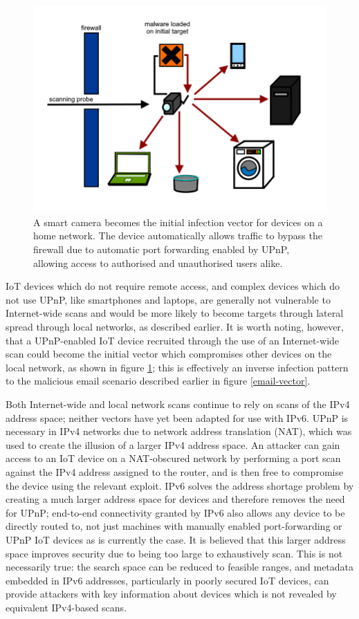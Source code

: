 \documentclass[10pt,sigconf]{acmart}
\begin{document}
\begin{figure}
\centering
        \includegraphics[totalheight=8cm]{scanning.png}
    \caption{A smart camera becomes the initial infection vector for devices on a home network. The device automatically allows traffic to bypass the firewall due to automatic port forwarding enabled by UPnP, allowing access to authorised and unauthorised users alike.}
    \label{iot-vector}
\end{figure}

IoT devices which do not require remote access, and complex devices which do not use UPnP, like smartphones and laptops, are generally not vulnerable to Internet-wide scans and would be more likely to become targets through lateral spread through local networks, as described earlier.
It is worth noting, however, that a UPnP-enabled IoT device recruited through the use of an Internet-wide scan could become the initial vector which compromises other devices on the local network, as shown in figure \ref{iot-vector};
this is effectively an inverse infection pattern to the malicious email scenario described earlier in figure \ref{email-vector}.


Both Internet-wide and local network scans continue to rely on scans of the IPv4 address space;
neither vectors have yet been adapted for use with IPv6.
UPnP is necessary in IPv4 networks due to network address translation (NAT), which was used to create the illusion of a larger IPv4 address space.
An attacker can gain access to an IoT device on a NAT-obscured network by performing a port scan against the IPv4 address assigned to the router, and is then free to compromise the device using the relevant exploit.
IPv6 solves the address shortage problem by creating a much larger address space for devices and therefore removes the need for UPnP;
end-to-end connectivity granted by IPv6 also allows any device to be directly routed to, not just machines with manually enabled port-forwarding or UPnP IoT devices as is currently the case.
It is believed that this larger address space improves security due to being too large to exhaustively scan.
This is not necessarily true:
the search space can be reduced to feasible ranges, and metadata embedded in IPv6 addresses, particularly in poorly secured IoT devices, can provide attackers with key information about devices which is not revealed by equivalent IPv4-based scans.
\end{document}
